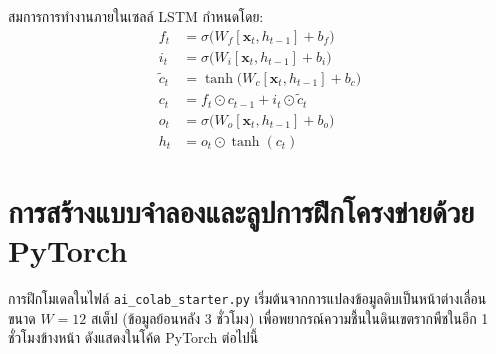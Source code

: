 สมการการทำงานภายในเซลล์ LSTM กำหนดโดย:
\begin{align}
    f_t &= \sigma\Big( W_f [\mathbf{x}_t, h_{t-1}] + b_f \Big) \label{eq:forget_gate} \\
    i_t &= \sigma\Big( W_i [\mathbf{x}_t, h_{t-1}] + b_i \Big) \label{eq:input_gate} \\
    \tilde{c}_t &= \tanh\Big( W_c [\mathbf{x}_t, h_{t-1}] + b_c \Big) \label{eq:candidate_cell} \\
    c_t &= f_t \odot c_{t-1} + i_t \odot \tilde{c}_t \label{eq:cell_state} \\
    o_t &= \sigma\Big( W_o [\mathbf{x}_t, h_{t-1}] + b_o \Big) \label{eq:output_gate} \\
    h_t &= o_t \odot \tanh(c_t) \label{eq:hidden_state}
\end{align}

\section{การสร้างแบบจำลองและลูปการฝึกโครงข่ายด้วย PyTorch}

การฝึกโมเดลในไฟล์ \texttt{ai\_colab\_starter.py} เริ่มต้นจากการแปลงข้อมูลดิบเป็นหน้าต่างเลื่อนขนาด $W = 12$ สเต็ป (ข้อมูลย้อนหลัง 3 ชั่วโมง) เพื่อพยากรณ์ความชื้นในดินเขตรากพืชในอีก 1 ชั่วโมงข้างหน้า ดังแสดงในโค้ด PyTorch ต่อไปนี้


